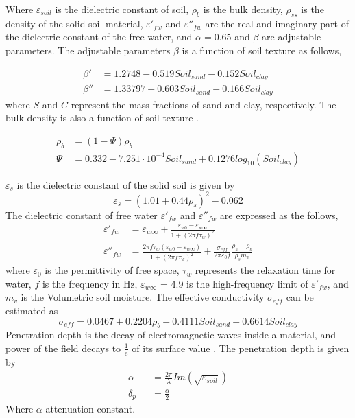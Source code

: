 \documentclass[draftcls,onecolumn]{IEEEtran}  %
\begin{document}
Where $\varepsilon_{soil}$ is the dielectric constant of soil, $\rho_b$ is the bulk density, $\rho_{ss}$ is the density of the solid soil material, $\varepsilon'_{fw}$ and $\varepsilon''_{fw}$ are the real and imaginary part of the dielectric constant of the free water, and $\alpha=0.65$ and $\beta$ are adjustable parameters. The adjustable parameters $\beta$ is a function of soil texture as follows,

\begin{equation}
\begin{split}
	\beta' &= 1.2748-0.519Soil_{sand}-0.152Soil_{clay} \\
    \beta'' &=1.33797-0.603Soil_{sand}-0.166Soil_{clay}
 \end{split}
\end{equation}
where $S$ and $C$ represent the mass fractions of sand and clay, respectively. The bulk density is also a function of soil texture \cite{Saxton:1986}.

\begin{equation} \label{eq: bulk_density}
\begin{split}
	 \rho_b &= (1-\Psi)\rho_b \\
	  \Psi &= 0.332 - 7.251 \cdot 10^{-4} Soil_{sand} + 0.1276 log_{10}(Soil_{clay})
\end{split}
\end{equation}

$\varepsilon_{s} $ is the dielectric constant of the solid soil is given by
\begin{equation}
	\varepsilon_s = (1.01+0.44\rho_s)^2-0.062
\end{equation}
The dielectric constant of free water $\varepsilon'_{fw}$ and $\varepsilon''_{fw}$ are expressed as the follows,
\begin{equation}
\begin{split}
	\varepsilon'_{fw} &=\varepsilon_{w\infty} + \frac{\varepsilon_{w0}-\varepsilon_{w\infty}}{1+(2 \pi f \tau_w)^2} \\
    \varepsilon''_{fw} &=\frac{2 \pi f \tau_w(\varepsilon_{w0}-\varepsilon_{w\infty})}{1+(2 \pi f \tau_w)^2} + \frac{\sigma_{eff}}{2 \pi \varepsilon_0 f} \frac{\rho_s-\rho_b}{\rho_s m_v} 
\end{split}
\end{equation}
where $\varepsilon_0$ is the permittivity of free space, $\tau_w$ represents the relaxation time for water, $f$ is the frequency in Hz, $\varepsilon_{w\infty}$ = 4.9 is the high-frequency limit of $\varepsilon'_{fw}$, and $m_v$ is the Volumetric soil moisture. The effective conductivity $\sigma_{eff}$ can be estimated as
\begin{equation}
	\sigma_{eff} = 0.0467+0.2204\rho_b-0.4111Soil_{sand}+0.6614Soil_{clay}
\end{equation}
Penetration depth is the decay of electromagnetic waves inside a material, and power of the field decays to $\frac{1}{e}$ of its surface value \cite{Ulaby:1981} . The penetration depth is given by
\begin{eqnarray}
	\alpha &&= \frac{2\pi}{\lambda} Im(\sqrt{\varepsilon_{soil}}) \\
    \delta_p &&= \frac{\alpha}{2}
\end{eqnarray}
Where  $\alpha$ attenuation constant.
\end{document}
